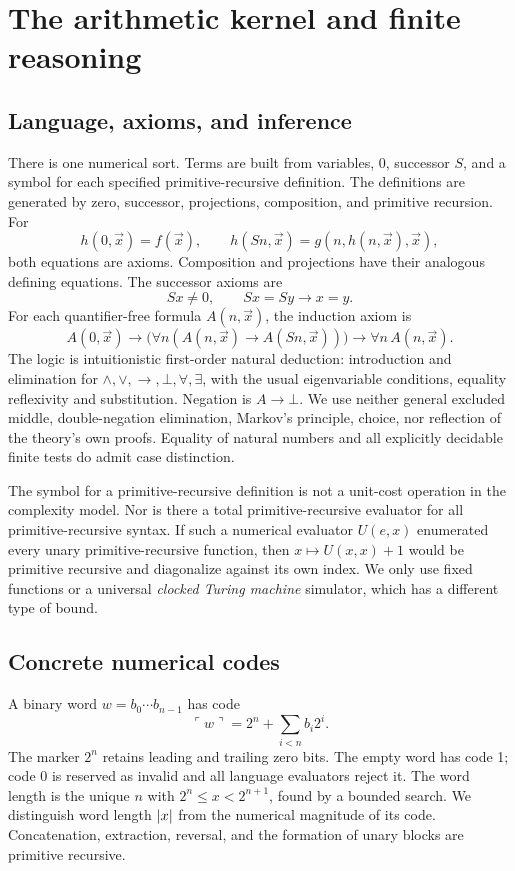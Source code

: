 \section{The arithmetic kernel and finite reasoning}
\label{sec:kernel}

\subsection{Language, axioms, and inference}

There is one numerical sort. Terms are built from variables, \(0\), successor
\(S\), and a symbol for each specified primitive-recursive definition. The
definitions are generated by zero, successor, projections, composition, and
primitive recursion. For
\[
 h(0,\vec x)=f(\vec x),\qquad
 h(Sn,\vec x)=g(n,h(n,\vec x),\vec x),
\]
both equations are axioms. Composition and projections have their analogous
defining equations. The successor axioms are
\[
 Sx\ne0,\qquad Sx=Sy\longrightarrow x=y.
\]
For each quantifier-free formula \(A(n,\vec x)\), the induction axiom is
\[
 A(0,\vec x)\longrightarrow
 \bigl(\forall n(A(n,\vec x)\longrightarrow A(Sn,\vec x))\bigr)
 \longrightarrow\forall n\,A(n,\vec x).
\]
The logic is intuitionistic first-order natural deduction: introduction and
elimination for \(\land,\lor,\to,\bot,\forall,\exists\), with the usual
eigenvariable conditions, equality reflexivity and substitution. Negation is
\(A\to\bot\). We use neither general excluded middle, double-negation
elimination, Markov's principle, choice, nor reflection of the theory's own
proofs. Equality of natural numbers and all explicitly decidable finite tests
do admit case distinction.

The symbol for a primitive-recursive definition is not a unit-cost operation
in the complexity model. Nor is there a total primitive-recursive evaluator
for all primitive-recursive syntax. If such a numerical evaluator \(U(e,x)\)
enumerated every unary primitive-recursive function, then
\(x\mapsto U(x,x)+1\) would be primitive recursive and diagonalize against its
own index. We only use fixed functions or a universal \emph{clocked Turing
machine} simulator, which has a different type of bound.

\subsection{Concrete numerical codes}

A binary word \(w=b_0\cdots b_{n-1}\) has code
\[
 \ulcorner w\urcorner=2^n+\sum_{i<n}b_i2^i.
\]
The marker \(2^n\) retains leading and trailing zero bits. The empty word has
code 1; code 0 is reserved as invalid and all language evaluators reject it.
The word length is the unique \(n\) with \(2^n\le x<2^{n+1}\), found by a
bounded search. We distinguish word length \(\lvert x\rvert\) from the numerical
magnitude of its code. Concatenation, extraction, reversal, and the formation
of unary blocks are primitive recursive.

